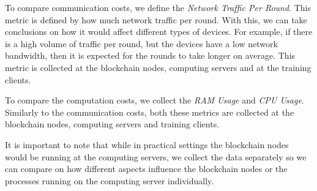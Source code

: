To compare communication costs, we define the \textit{Network Traffic Per Round}. This metric is defined by how much network traffic per round. With this, we can take conclusions on how it would affect different types of devices. For example, if there is a high volume of traffic per round, but the devices have a low network bandwidth, then it is expected for the rounds to take longer on average. This metric is collected at the blockchain nodes, computing servers and at the training clients.

To compare the computation costs, we collect the \textit{RAM Usage} and \textit{CPU Usage}. Similarly to the communication costs, both these metrics are collected at the blockchain nodes, computing servers and training clients.

It is important to note that while in practical settings the blockchain nodes would be running at the computing servers, we collect the data separately so we can compare on how different aspects influence the blockchain nodes or the processes running on the computing server individually.
